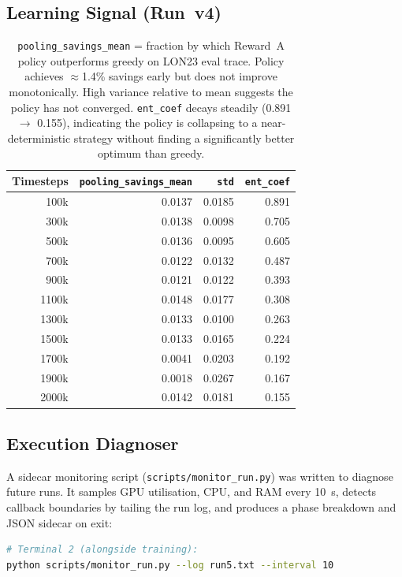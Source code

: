 \documentclass[11pt]{article}
\begin{document}
\subsection{Learning Signal (Run~v4)}

\begin{table}[h]
\centering
\begin{tabular}{rrrr}
\toprule
Timesteps & \texttt{pooling\_savings\_mean} & \texttt{std} & \texttt{ent\_coef} \\
\midrule
100k  & 0.0137 &  0.0185 & 0.891 \\
300k  & 0.0138 &  0.0098 & 0.705 \\
500k  & 0.0136 &  0.0095 & 0.605 \\
700k  & 0.0122 &  0.0132 & 0.487 \\
900k  & 0.0121 &  0.0122 & 0.393 \\
1100k & 0.0148 &  0.0177 & 0.308 \\
1300k & 0.0133 &  0.0100 & 0.263 \\
1500k & 0.0133 &  0.0165 & 0.224 \\
1700k & 0.0041 &  0.0203 & 0.192 \\
1900k & 0.0018 &  0.0267 & 0.167 \\
2000k & 0.0142 &  0.0181 & 0.155 \\
\bottomrule
\end{tabular}
\caption{\texttt{pooling\_savings\_mean} = fraction by which Reward~A policy
outperforms greedy on LON23 eval trace. Policy achieves $\approx$1.4\%
savings early but does not improve monotonically. High variance relative
to mean suggests the policy has not converged. \texttt{ent\_coef} decays
steadily (0.891 $\to$ 0.155), indicating the policy is collapsing to a
near-deterministic strategy without finding a significantly better optimum
than greedy.}
\end{table}

\subsection{Execution Diagnoser}

A sidecar monitoring script (\texttt{scripts/monitor\_run.py}) was written to
diagnose future runs.  It samples GPU utilisation, CPU, and RAM every 10~s,
detects callback boundaries by tailing the run log, and produces a phase
breakdown and JSON sidecar on exit:

\begin{lstlisting}[language=bash]
# Terminal 2 (alongside training):
python scripts/monitor_run.py --log run5.txt --interval 10
\end{lstlisting}
\end{document}
